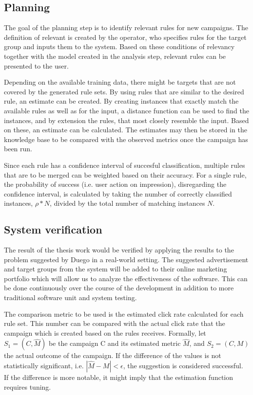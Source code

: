 \documentclass[a4paper]{article}
\begin{document}
\subsection{Planning}
The goal of the planning step is to identify relevant rules for new campaigns. The definition of relevant is created by the operator, who specifies rules for the target group and inputs them to the system. Based on these conditions of relevancy together with the model created in the analysis step, relevant rules can be presented to the user.

Depending on the available training data, there might be targets that are not covered by the generated rule sets. By using rules that are similar to the desired rule, an estimate can be created. By creating instances that exactly match the available rules as well as for the input, a distance function can be used to find the instances, and by extension the rules, that most closely  resemble the input. Based on these, an estimate can be calculated. The estimates may then be stored in the knowledge base to be compared with the observed metrics once the campaign has been run.

Since each rule has a confidence interval of succesful classification, multiple rules that are to be merged can be weighted based on their accuracy. For a single rule, the probability of success (i.e. user action on impression), disregarding the confidence interval, is calculated by taking the number of correctly classified instances, \(\rho*N\), divided by the total number of matching instances \(N\).

\subsection{System verification}
The result of the thesis work would be verified by applying the results to the problem suggested by Duego in a real-world setting. The suggested advertisement and target groups from the system will be added to their online marketing portfolio which will allow us to analyze the effectiveness of the software. This can be done continuously over the course of the development in addition to more traditional software unit and system testing.

The comparison metric to be used is the estimated click rate calculated for each rule set. This number can be compared with the actual click rate that the campaign which is created based on the rules receives. Formally, let \(S_1 = (C, \hat{M})\) be the  campaign C and its estimated metric \(\hat{M}\), and \(S_2 = (C, M)\) the actual outcome of the campaign. If the difference  of the values is not statistically significant, i.e. \(|\hat{M} - M| < \epsilon\), the suggestion is considered successful. If the difference is more notable, it might imply that the estimation function requires tuning.
\end{document}
